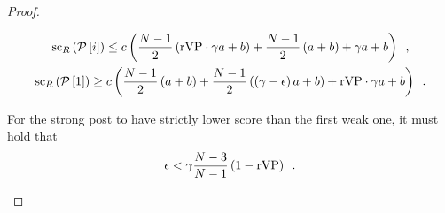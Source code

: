 \begin{proof}
\begin{itemize}
    \begin{gather*}
      \mathrm{sc}_{R}\left(\mathcal{P}\left[i\right]\right) \leq
      c\left(\frac{N - 1}{2}\left(\mathrm{rVP} \cdot \gamma a +
      b\right) + \frac{N - 1}{2}\left(a + b\right) + \gamma a + b\right)
      \enspace, \\
      \mathrm{sc}_{R}\left(\mathcal{P}\left[1\right]\right) \geq
      c\left(\frac{N - 1}{2}\left(a + b\right) + \frac{N -
      1}{2}\left(\left(\gamma - \epsilon\right) a + b\right) +
      \mathrm{rVP} \cdot \gamma a + b\right) \enspace.
    \end{gather*}

    For the strong post to have strictly lower score than the first weak one, it
    must hold that
    \begin{equation*}
      \epsilon < \gamma\frac{N - 3}{N - 1}\left(1 -
      \mathrm{rVP}\right) \enspace.
    \end{equation*}
  \end{itemize}
\end{proof}
